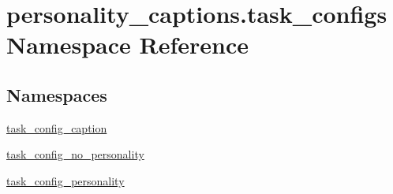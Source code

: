 \hypertarget{namespacepersonality__captions_1_1task__configs}{}\section{personality\+\_\+captions.\+task\+\_\+configs Namespace Reference}
\label{namespacepersonality__captions_1_1task__configs}
\subsection*{Namespaces}
\begin{DoxyCompactItemize}
\item 
 \hyperlink{namespacepersonality__captions_1_1task__configs_1_1task__config__caption}{task\+\_\+config\+\_\+caption}
\item 
 \hyperlink{namespacepersonality__captions_1_1task__configs_1_1task__config__no__personality}{task\+\_\+config\+\_\+no\+\_\+personality}
\item 
 \hyperlink{namespacepersonality__captions_1_1task__configs_1_1task__config__personality}{task\+\_\+config\+\_\+personality}
\end{DoxyCompactItemize}

